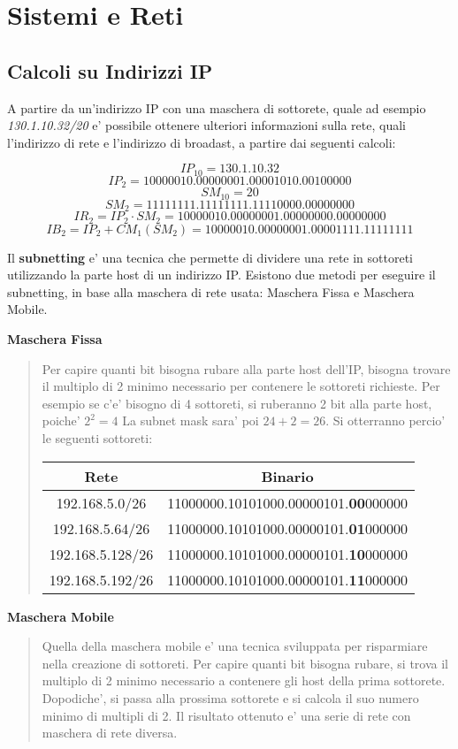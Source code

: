 \documentclass{article}
\begin{document}
  \newpage
  \tableofcontents
  \newpage

  \section{Sistemi e Reti}
  {
    \subsection{Calcoli su Indirizzi IP}
    A partire da un'indirizzo IP con una maschera di sottorete, quale ad esempio \textit{130.1.10.32/20} e' possibile ottenere ulteriori informazioni sulla rete, quali l'indirizzo di rete e l'indirizzo di broadast, a partire dai seguenti calcoli:

    $$ IP_{10} = 130.1.10.32 $$ 
    $$ IP_{2} = 10000010.00000001.00001010.00100000 $$
    $$ SM_{10} = 20 $$
    $$ SM_{2} = 11111111.11111111.11110000.00000000 $$
    $$ IR_{2} = IP_{2} \cdot SM_{2} = 10000010.00000001.00000000.00000000 $$
    $$ IB_{2} = IP_{2} + CM_{1}(SM_{2}) = 10000010.00000001.00001111.11111111 $$

    Il \textbf{subnetting} e' una tecnica che permette di dividere una rete in sottoreti utilizzando la parte host di un indirizzo IP. Esistono due metodi per eseguire il subnetting, in base alla maschera di rete usata: Maschera Fissa e Maschera Mobile.

    \textbf{Maschera Fissa}
    \begin{quote}
      Per capire quanti bit bisogna rubare alla parte host dell'IP, bisogna trovare il multiplo di 2 minimo necessario per contenere le sottoreti richieste. Per esempio se c'e' bisogno di 4 sottoreti, si ruberanno 2 bit alla parte host, poiche' $ 2^2 = 4 $ La subnet mask sara' poi $ 24 + 2 = 26 $. Si otterranno percio' le seguenti sottoreti:

      \begin{tabular}{ |c|c| }
        \hline
        Rete & Binario \\
        \hline
        192.168.5.0/26 & 11000000.10101000.00000101.\textbf{00}000000 \\
        192.168.5.64/26 & 11000000.10101000.00000101.\textbf{01}000000 \\
        192.168.5.128/26 & 11000000.10101000.00000101.\textbf{10}000000 \\
        192.168.5.192/26 & 11000000.10101000.00000101.\textbf{11}000000 \\
        \hline
      \end{tabular}
    \end{quote}

    \textbf{Maschera Mobile}
    \begin{quote}
      Quella della maschera mobile e' una tecnica sviluppata per risparmiare nella creazione di sottoreti. Per capire quanti bit bisogna rubare, si trova il multiplo di 2 minimo necessario a contenere gli host della prima sottorete. Dopodiche', si passa alla prossima sottorete e si calcola il suo numero minimo di multipli di 2. Il risultato ottenuto e' una serie di rete con maschera di rete diversa.
    \end{quote}
  }
\end{document}
